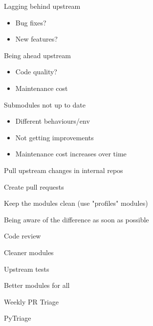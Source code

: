 \begin{iframe}[Problems]
    \item Lagging behind upstream
        \begin{itemize}
            \item Bug fixes?
            \item New features?
        \end{itemize}
    \item Being ahead upstream
        \begin{itemize}
            \item Code quality?
            \item Maintenance cost
        \end{itemize}
    \item Submodules not up to date
        \begin{itemize}
            \item Different behaviours/env
            \item Not getting improvements
            \item Maintenance cost increases over time
        \end{itemize}
\end{iframe}
\begin{iframe}
\item Pull upstream changes in internal repos
\item Create pull requests
\item Keep the modules clean (use "profiles" modules)
\end{iframe}
\begin{iframe}
\item Being aware of the difference as soon as possible
\end{iframe}
\begin{iframe}
\item Code review
\item Cleaner modules
\item Upstream tests
\item Better modules for all
\end{iframe}
\begin{iframe}[Automating it!]
\item Weekly PR Triage
\item PyTriage
\end{iframe}
